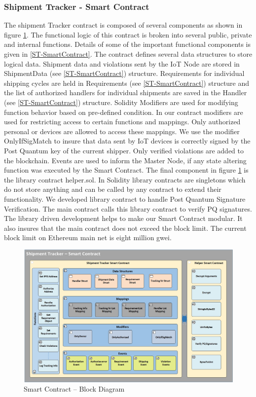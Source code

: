 \subsubsection{Shipment Tracker - Smart Contract} \label{ST-SC} 
The shipment Tracker contract is composed of several components as shown in figure \ref{fig:ArchitectureSC}. The functional logic of this contract is broken into several public, private and internal functions. Details of some of the important functional components is given in \ref{ST-SmartContract}.  The contract defines several data structures to store logical data. Shipment data and violations sent by the IoT Node are stored in ShipmentData (see \ref{ST-SmartContract}) structure. Requirements for individual shipping cycles are held in Requirements (see \ref{ST-SmartContract}) structure and the list of authorized handlers for individual shipments are saved in the Handler (see \ref{ST-SmartContract}) structure. Solidity Modifiers are used for modifying function behavior based on pre-defined condition. In our contract modifiers are used for restricting access to certain functions and mappings. Only authorized personal or devices are allowed to access these mappings. We use the modifier OnlyIfSigMatch to insure that data sent by IoT devices is correctly signed by the Post Quantum key of the current shipper. Only verified violations are added to the blockchain. Events are used to inform the Master Node, if any state altering function was executed by the Smart Contract. The final component in figure \ref{fig:ArchitectureSC} is the library contract helper.sol. In Solidity library contracts are singletons which do not store anything and can be called by any contract to extend their functionality. We developed library contract to handle Post Quantum Signature Verification. The main contract calls this library contract to verify PQ signatures. The library driven development helps to make our Smart Contract modular. It also insures that the main contract does not exceed the block limit. The current block limit on Ethereum main net is eight million gwei.  
\begin{figure}[h]
	\centering
    \includegraphics[width=170mm,scale=1]{figs/SC-BD}
	\caption{Smart Contract – Block Diagram}
	\label{fig:ArchitectureSC} 
\end{figure}
\clearpage



